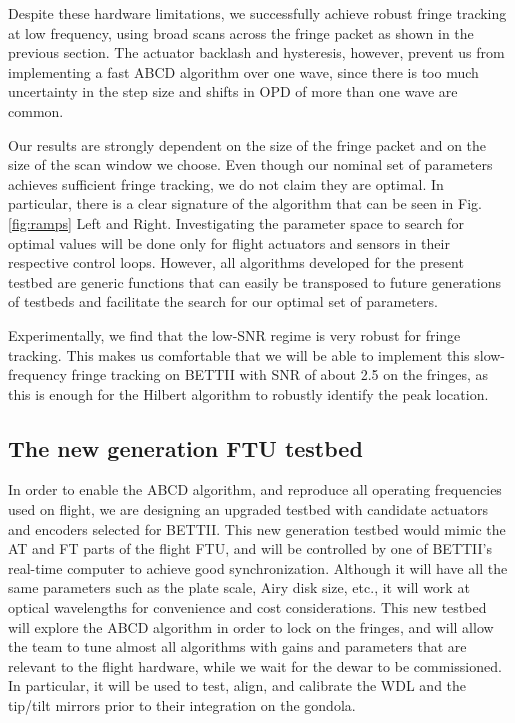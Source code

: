 Despite these hardware limitations, we successfully achieve robust fringe tracking at low frequency, using broad scans across the fringe packet as shown in the previous section. The actuator backlash and hysteresis, however, prevent us from implementing a fast ABCD algorithm over one wave, since there is too much uncertainty in the step size and shifts in OPD of more than one wave are common. 

Our results are strongly dependent on the size of the fringe packet and on the size of the scan window we choose. Even though our nominal set of parameters achieves sufficient fringe tracking, we do not claim they are optimal. In particular, there is a clear signature of the algorithm that can be seen in Fig. \ref{fig:ramps} Left and Right. Investigating the parameter space to search for optimal values will be done only for flight actuators and sensors in their respective control loops. However, all algorithms developed for the present testbed are generic functions that can easily be transposed to future generations of testbeds and facilitate the search for our optimal set of parameters.

Experimentally, we find that the low-SNR regime is very robust for fringe tracking. This makes us comfortable that we will be able to implement this slow-frequency fringe tracking on BETTII with SNR of about 2.5 on the fringes, as this is enough for the Hilbert algorithm to robustly identify the peak location.




\subsection{The new generation FTU testbed}\label{subsec:newFTU}

In order to enable the ABCD algorithm, and reproduce all operating frequencies used on flight, we are designing an upgraded testbed with candidate actuators and encoders selected for BETTII. This new generation testbed would mimic the AT and FT parts of the flight FTU, and will be controlled by one of BETTII's real-time computer to achieve good synchronization. Although it will have all the same parameters such as the plate scale, Airy disk size, etc., it will work at optical wavelengths for convenience and cost considerations. This new testbed will explore the ABCD algorithm in order to lock on the fringes, and will allow the team to tune almost all algorithms with gains and parameters that are relevant to the flight hardware, while we wait for the dewar to be commissioned. In particular, it will be used to test, align, and calibrate the WDL and the tip/tilt mirrors prior to their integration on the gondola.

